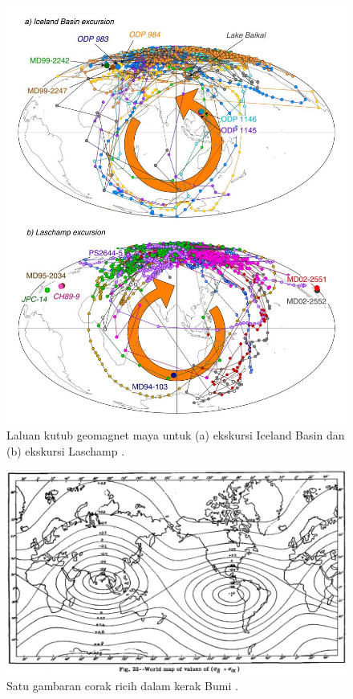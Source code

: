 \documentclass[10pt,twocolumn,letterpaper]{article}
\begin{document}
\begin{figure}[t]
\begin{center}
   \includegraphics[width=0.95\linewidth]{laj.jpg}
\end{center}
   \caption{Laluan kutub geomagnet maya untuk (a) ekskursi Iceland Basin dan (b) ekskursi Laschamp \cite{35}.}
\label{fig:7}
\label{fig:onecol}
\end{figure}

\begin{figure}[t]
\begin{center}
   \includegraphics[width=1\linewidth]{meinesz3.jpg}
\end{center}
   \caption{Satu gambaran corak ricih dalam kerak Bumi \cite{36}.}
\label{fig:8}
\label{fig:onecol}
\end{figure}
\end{document}
